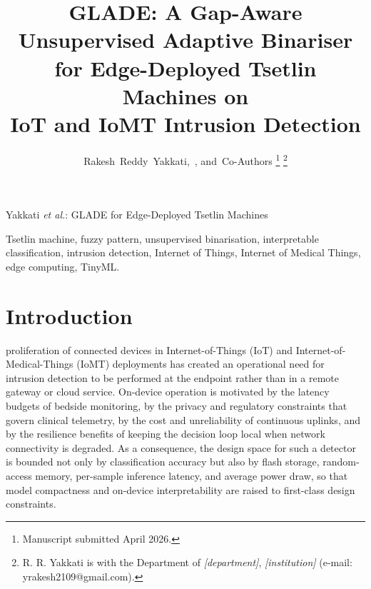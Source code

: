 \documentclass[journal,10pt]{IEEEtran}
\begin{document}
\title{GLADE: A Gap-Aware Unsupervised Adaptive Binariser \\
       for Edge-Deployed Tsetlin Machines on \\
       IoT and IoMT Intrusion Detection}

\author{Rakesh~Reddy~Yakkati,~,
        and~Co-Authors%
\thanks{Manuscript submitted April 2026.}%
\thanks{R. R. Yakkati is with the Department of \textit{[department]},
\textit{[institution]} (e-mail: yrakesh2109@gmail.com).}}

%
         {Yakkati \MakeLowercase{\textit{et al.}}: GLADE for Edge-Deployed Tsetlin Machines}

\maketitle

\begin{abstract}

\end{abstract}

\begin{IEEEkeywords}
Tsetlin machine, fuzzy pattern, unsupervised binarisation,
interpretable classification, intrusion detection, Internet of Things,
Internet of Medical Things, edge computing, TinyML.
\end{IEEEkeywords}



\section{Introduction}
 proliferation of connected devices in
Internet-of-Things (IoT) and Internet-of-Medical-Things (IoMT)
deployments has created an operational need for intrusion detection to
be performed at the endpoint rather than in a remote gateway or cloud
service. On-device operation is motivated by the latency budgets of
bedside monitoring, by the privacy and regulatory constraints that
govern clinical telemetry, by the cost and unreliability of continuous
uplinks, and by the resilience benefits of keeping the decision loop
local when network connectivity is degraded. As a consequence, the
design space for such a detector is bounded not only by classification
accuracy but also by flash storage, random-access memory, per-sample
inference latency, and average power draw, so that model compactness
and on-device interpretability are raised to first-class design
constraints.
\end{document}
